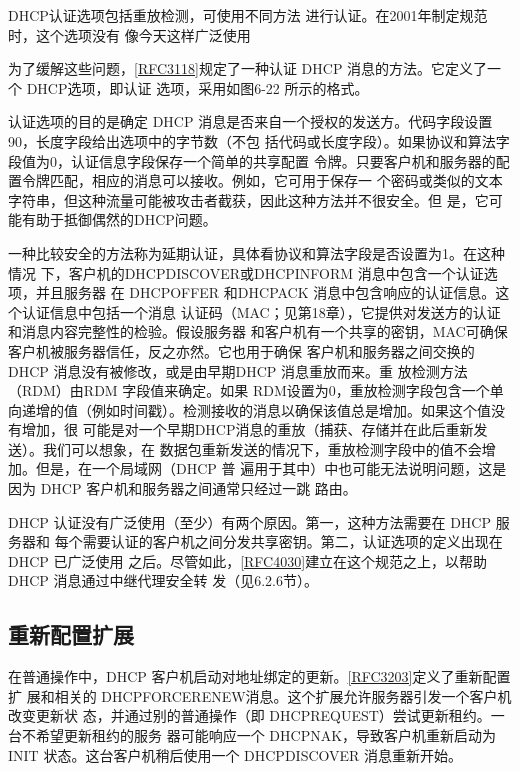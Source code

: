 DHCP认证选项包括重放检测，可使用不同方法
进行认证。在2001年制定规范时，这个选项没有
像今天这样广泛使用

为了缓解这些问题，\href{https://www.rfc-editor.org/rfc/rfc3118}{\href{https://www.rfc-editor.org/rfc/rfc3118}{[RFC3118]}}规定了一种认证 DHCP 消息的方法。它定义了一个 DHCP选项，即认证
选项，采用如图6-22 所示的格式。

认证选项的目的是确定 DHCP
消息是否来自一个授权的发送方。代码字段设置90，长度字段给出选项中的字节数（不包
括代码或长度字段）。如果协议和算法字段值为0，认证信息字段保存一个简单的共享配置
令牌。只要客户机和服务器的配置令牌匹配，相应的消息可以接收。例如，它可用于保存一
个密码或类似的文本字符串，但这种流量可能被攻击者截获，因此这种方法并不很安全。但
是，它可能有助于抵御偶然的DHCP问题。

一种比较安全的方法称为延期认证，具体看协议和算法字段是否设置为1。在这种情况
下，客户机的DHCPDISCOVER或DHCPINFORM 消息中包含一个认证选项，并且服务器
在 DHCPOFFER 和DHCPACK 消息中包含响应的认证信息。这个认证信息中包括一个消息
认证码（MAC；见第18章），它提供对发送方的认证和消息内容完整性的检验。假设服务器
和客户机有一个共享的密钥，MAC可确保客户机被服务器信任，反之亦然。它也用于确保
客户机和服务器之间交换的 DHCP 消息没有被修改，或是由早期DHCP 消息重放而来。重
放检测方法（RDM）由RDM 字段值来确定。如果 RDM设置为0，重放检测字段包含一个单
向递增的值（例如时间戳）。检测接收的消息以确保该值总是增加。如果这个值没有增加，很
可能是对一个早期DHCP消息的重放（捕获、存储并在此后重新发送）。我们可以想象，在
数据包重新发送的情况下，重放检测字段中的值不会增加。但是，在一个局域网（DHCP 普
遍用于其中）中也可能无法说明问题，这是因为 DHCP 客户机和服务器之间通常只经过一跳
路由。

DHCP 认证没有广泛使用（至少）有两个原因。第一，这种方法需要在 DHCP 服务器和
每个需要认证的客户机之间分发共享密钥。第二，认证选项的定义出现在DHCP 已广泛使用
之后。尽管如此，\href{https://www.rfc-editor.org/rfc/rfc4030}{\href{https://www.rfc-editor.org/rfc/rfc4030}{[RFC4030]}}建立在这个规范之上，以帮助DHCP 消息通过中继代理安全转
发（见6.2.6节）。

\subsection{重新配置扩展}
在普通操作中，DHCP 客户机启动对地址绑定的更新。\href{https://www.rfc-editor.org/rfc/rfc3203}{\href{https://www.rfc-editor.org/rfc/rfc3203}{[RFC3203]}}定义了重新配置扩
展和相关的 DHCPFORCERENEW消息。这个扩展允许服务器引发一个客户机改变更新状
态，并通过别的普通操作（即 DHCPREQUEST）尝试更新租约。一台不希望更新租约的服务
器可能响应一个 DHCPNAK，导致客户机重新启动为 INIT 状态。这台客户机稍后使用一个
DHCPDISCOVER 消息重新开始。

